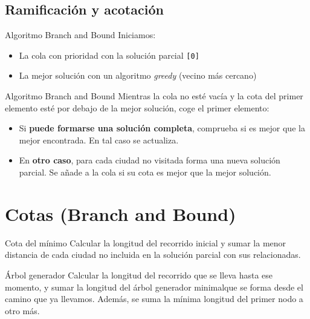 \subsection{Ramificación y acotación}

\begin{frame}{Algoritmo Branch and Bound}
  Iniciamos:
  \begin{itemize}
    \item La cola con prioridad con la solución parcial \texttt{[0]}
    \item La mejor solución con un algoritmo \textit{greedy} (vecino más cercano)
  \end{itemize}
\end{frame}

\begin{frame}{Algoritmo Branch and Bound}
  Mientras la cola no esté vacía y la cota del primer elemento esté por debajo de la mejor solución, coge el primer elemento:
  \begin{itemize}
    \item Si \textbf{puede formarse una solución completa}, comprueba si es mejor que la mejor encontrada. En tal caso se actualiza.
    \item En \textbf{otro caso}, para cada ciudad no visitada forma una nueva solución parcial. Se añade a la cola si su cota es mejor que la mejor solución.
  \end{itemize}
\end{frame}

\section{Cotas (Branch and Bound)}

\begin{frame}{Cota del mínimo}
  Calcular la longitud del recorrido inicial y sumar la menor distancia de cada ciudad no incluida en la solución parcial con sus relacionadas.
\end{frame}

\begin{frame}{Árbol generador}
  Calcular la longitud del recorrido que se lleva hasta ese momento, y sumar la longitud del árbol generador minimalque se forma desde el camino que ya llevamos. Además, se suma la mínima longitud del primer nodo a otro más.

\end{frame}


